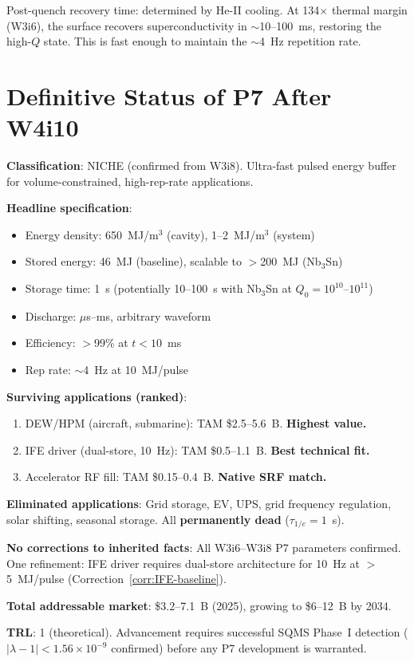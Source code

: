 \documentclass[11pt]{article}
\newcommand{\ee}[1]{\times 10^{#1}}
\begin{document}
Post-quench recovery time: determined by He-II cooling. At 134$\times$
thermal margin (W3i6), the surface recovers superconductivity in
$\sim$10--100~ms, restoring the high-$Q$ state. This is fast enough
to maintain the $\sim$4~Hz repetition rate.

\section*{Definitive Status of P7 After W4i10}

\begin{tcolorbox}[colback=green!5!white, colframe=green!40!black,
  title=\textbf{P7 Status: W4i10 Final}]

\textbf{Classification}: NICHE (confirmed from W3i8). Ultra-fast pulsed
energy buffer for volume-constrained, high-rep-rate applications.

\textbf{Headline specification}:
\begin{itemize}[nosep]
  \item Energy density: 650~MJ/m$^3$ (cavity), 1--2~MJ/m$^3$ (system)
  \item Stored energy: 46~MJ (baseline), scalable to $>$200~MJ (Nb$_3$Sn)
  \item Storage time: 1~s (potentially 10--100~s with Nb$_3$Sn at
    $Q_0 = 10^{10}$--$10^{11}$)
  \item Discharge: $\mu$s--ms, arbitrary waveform
  \item Efficiency: $>$99\% at $t < 10$~ms
  \item Rep rate: $\sim$4~Hz at 10~MJ/pulse
\end{itemize}

\textbf{Surviving applications (ranked)}:
\begin{enumerate}[nosep]
  \item DEW/HPM (aircraft, submarine): TAM \$2.5--5.6~B. \textbf{Highest value.}
  \item IFE driver (dual-store, 10~Hz): TAM \$0.5--1.1~B. \textbf{Best technical fit.}
  \item Accelerator RF fill: TAM \$0.15--0.4~B. \textbf{Native SRF match.}
\end{enumerate}

\textbf{Eliminated applications}: Grid storage, EV, UPS, grid frequency
regulation, solar shifting, seasonal storage. All \textbf{permanently dead}
($\tau_{1/e} = 1$~s).

\textbf{No corrections to inherited facts}: All W3i6--W3i8 P7 parameters
confirmed. One refinement: IFE driver requires dual-store architecture
for 10~Hz at $>$5~MJ/pulse (Correction~\ref{corr:IFE-baseline}).

\textbf{Total addressable market}: \$3.2--7.1~B (2025), growing to
\$6--12~B by 2034.

\textbf{TRL}: 1 (theoretical). Advancement requires successful SQMS
Phase~I detection ($|{\lambda-1}| < 1.56\ee{-9}$ confirmed) before any
P7 development is warranted.
\end{tcolorbox}
\end{document}
